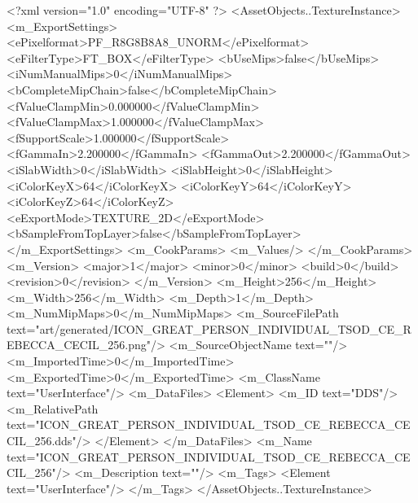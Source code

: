 <?xml version="1.0" encoding="UTF-8" ?>
<AssetObjects..TextureInstance>
	<m_ExportSettings>
		<ePixelformat>PF_R8G8B8A8_UNORM</ePixelformat>
		<eFilterType>FT_BOX</eFilterType>
		<bUseMips>false</bUseMips>
		<iNumManualMips>0</iNumManualMips>
		<bCompleteMipChain>false</bCompleteMipChain>
		<fValueClampMin>0.000000</fValueClampMin>
		<fValueClampMax>1.000000</fValueClampMax>
		<fSupportScale>1.000000</fSupportScale>
		<fGammaIn>2.200000</fGammaIn>
		<fGammaOut>2.200000</fGammaOut>
		<iSlabWidth>0</iSlabWidth>
		<iSlabHeight>0</iSlabHeight>
		<iColorKeyX>64</iColorKeyX>
		<iColorKeyY>64</iColorKeyY>
		<iColorKeyZ>64</iColorKeyZ>
		<eExportMode>TEXTURE_2D</eExportMode>
		<bSampleFromTopLayer>false</bSampleFromTopLayer>
	</m_ExportSettings>
	<m_CookParams>
		<m_Values/>
	</m_CookParams>
	<m_Version>
		<major>1</major>
		<minor>0</minor>
		<build>0</build>
		<revision>0</revision>
	</m_Version>
	<m_Height>256</m_Height>
	<m_Width>256</m_Width>
	<m_Depth>1</m_Depth>
	<m_NumMipMaps>0</m_NumMipMaps>
	<m_SourceFilePath text="art/generated/ICON_GREAT_PERSON_INDIVIDUAL_TSOD_CE_REBECCA_CECIL_256.png"/>
	<m_SourceObjectName text=""/>
	<m_ImportedTime>0</m_ImportedTime>
	<m_ExportedTime>0</m_ExportedTime>
	<m_ClassName text="UserInterface"/>
	<m_DataFiles>
		<Element>
			<m_ID text="DDS"/>
			<m_RelativePath text="ICON_GREAT_PERSON_INDIVIDUAL_TSOD_CE_REBECCA_CECIL_256.dds"/>
		</Element>
	</m_DataFiles>
	<m_Name text="ICON_GREAT_PERSON_INDIVIDUAL_TSOD_CE_REBECCA_CECIL_256"/>
	<m_Description text=""/>
	<m_Tags>
		<Element text="UserInterface"/>
	</m_Tags>
</AssetObjects..TextureInstance>
